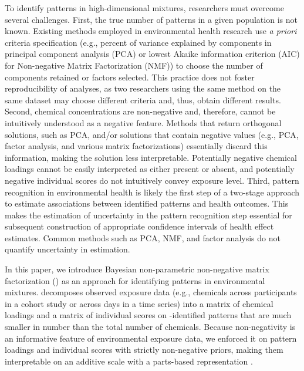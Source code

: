 To identify patterns in high-dimensional mixtures, researchers must overcome several challenges. First, the true number of patterns in a given population is not known. Existing methods employed in environmental health research use \textit{a priori} criteria specification (e.g., percent of variance explained by components in principal component analysis (PCA) or lowest Akaike information criterion (AIC) for Non-negative Matrix Factorization (NMF)) to choose the number of components retained or factors selected. This practice does not foster reproducibility of analyses, as two researchers using the same method on the same dataset may choose different criteria and, thus, obtain different results. Second, chemical concentrations are non-negative and, therefore, cannot be intuitively understood as a negative feature. Methods that return orthogonal solutions, such as PCA, and/or solutions that contain negative values (e.g., PCA, factor analysis, and various matrix factorizations) essentially discard this information, making the solution less interpretable. Potentially negative chemical loadings cannot be easily interpreted as either present or absent, and potentially negative individual scores do not intuitively convey exposure level. Third, pattern recognition in environmental health is likely the first step of a two-stage approach to estimate associations between identified patterns and health outcomes. This makes the estimation of uncertainty in the pattern recognition step essential for subsequent construction of appropriate confidence intervals of health effect estimates. Common methods such as PCA, NMF, and factor analysis do not quantify uncertainty in estimation.

In this paper, we introduce Bayesian non-parametric non-negative matrix factorization (\bnmfc) as an approach for identifying patterns in environmental mixtures. \bnmf decomposes observed exposure data (e.g., chemicals across participants in a cohort study or across days in a time series) into a matrix of chemical loadings and a matrix of individual scores on \bnmfc-identified patterns that are much smaller in number than the total number of chemicals. Because non-negativity is an informative feature of environmental exposure data, we enforced it on pattern loadings and individual scores with strictly non-negative priors, making them interpretable on an additive scale with a parts-based representation \citep{lee1999learning}.

